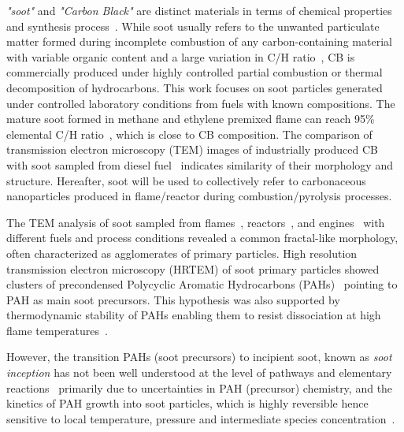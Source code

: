 \textit{"soot"} and \textit{"Carbon Black"} are distinct materials in terms of chemical properties and synthesis process~\cite{watson2001carbon}. While soot usually refers to the unwanted particulate matter formed during incomplete combustion of any carbon-containing material with variable organic content and a large variation in C/H ratio~\citep{watson2001carbon}, CB is commercially produced under highly controlled partial combustion or thermal decomposition of hydrocarbons. This work focuses on soot particles generated under controlled laboratory conditions from fuels with known compositions. The mature soot formed in methane and ethylene premixed flame can reach 95\% elemental C/H ratio~\cite{russo2015dehydrogenation}, which is close to CB composition. The comparison of transmission electron microscopy (TEM) images of industrially produced CB~\citep{singh2018nanostructure} with soot sampled from diesel fuel~\citep{vander2007hrtem, lapuerta2017morphological} indicates similarity of their morphology and structure. Hereafter, soot will be used to collectively refer to carbonaceous nanoparticles produced in flame/reactor during combustion/pyrolysis processes.

The TEM analysis of soot sampled from flames~\citep{lapuerta2017morphological}, reactors~\citep{ono2017experimental}, and engines~\citep{wei2020morphology} with different fuels and process conditions revealed a common fractal-like morphology, often characterized as agglomerates of primary particles. High resolution transmission electron microscopy (HRTEM) of soot primary particles showed clusters of precondensed Polycyclic Aromatic Hydrocarbons (PAHs)~\cite{alfe2009structure} pointing to PAH as main soot precursors. This hypothesis was also supported by thermodynamic stability of PAHs enabling them to resist dissociation at high flame temperatures~\cite{stein1985high}. 

However, the transition PAHs (soot precursors) to incipient soot, known as \textit{soot inception} has not been well understood at the level of pathways and elementary reactions~\cite{Wang2011} primarily due to uncertainties in PAH (precursor) chemistry, and the kinetics of PAH growth into soot particles, which is highly reversible hence sensitive to local temperature, pressure and intermediate species concentration~\cite{Wang2011}.

